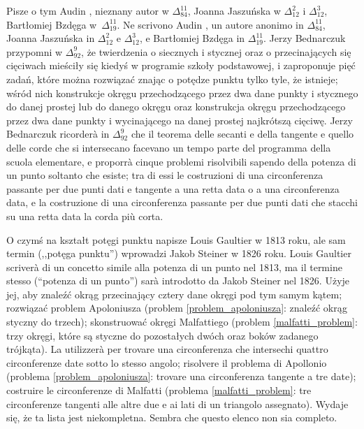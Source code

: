 Pisze o tym Audin \cite[s. 89]{audin_2003}, nieznany autor w $\Delta_{84}^{11}$, Joanna Jaszuńska w $\Delta_{12}^2$ i $\Delta_{12}^3$, Bartłomiej Bzdęga w~$\Delta_{19}^{11}$. %
Ne scrivono Audin \cite[p. 89]{audin_2003}, un autore anonimo in $\Delta_{84}^{11}$, Joanna Jaszuńska in $\Delta_{12}^2$ e $\Delta_{12}^3$, e Bartłomiej Bzdęga in $\Delta_{19}^{11}$. %
Jerzy Bednarczuk przypomni w $\Delta_{92}^{9}$, że twierdzenia o siecznych i stycznej oraz o przecinających się cięciwach mieściły się kiedyś w programie szkoły podstawowej, i zaproponuje pięć zadań, które można rozwiązać znając o potędze punktu tylko tyle, że istnieje; wśród nich konstrukcje okręgu przechodzącego przez dwa dane punkty i stycznego do danej prostej lub do danego okręgu oraz konstrukcja okręgu przechodzącego przez dwa dane punkty i wycinającego na danej prostej najkrótszą cięciwę. %
Jerzy Bednarczuk ricorderà in $\Delta_{92}^{9}$ che il teorema delle secanti e della tangente e quello delle corde che si intersecano facevano un tempo parte del programma della scuola elementare, e proporrà cinque problemi risolvibili sapendo della potenza di un punto soltanto che esiste; tra di essi le costruzioni di una circonferenza passante per due punti dati e tangente a una retta data o a una circonferenza data, e la costruzione di una circonferenza passante per due punti dati che stacchi su una retta data la corda più corta. %

O czymś na kształt potęgi punktu napisze Louis Gaultier w 1813 roku, ale sam termin (,,potęga punktu'') wprowadzi Jakob Steiner w 1826 roku. %
Louis Gaultier scriverà di un concetto simile alla potenza di un punto nel 1813, ma il termine stesso (``potenza di un punto'') sarà introdotto da Jakob Steiner nel 1826. %
%
%
Użyje jej, aby znaleźć okrąg przecinający cztery dane okręgi pod tym samym kątem; rozwiązać problem Apoloniusza (problem \ref{problem_apoloniusza}: znaleźć okrąg styczny do trzech); skonstruować okręgi Malfattiego (problem \ref{malfatti_problem}: trzy okręgi, które są styczne do pozostałych dwóch oraz boków zadanego trójkąta). %
La utilizzerà per trovare una circonferenza che intersechi quattro circonferenze date sotto lo stesso angolo; risolvere il problema di Apollonio (problema \ref{problem_apoloniusza}: trovare una circonferenza tangente a tre date); costruire le circonferenze di Malfatti (problema \ref{malfatti_problem}: tre circonferenze tangenti alle altre due e ai lati di un triangolo assegnato). %
Wydaje się, że ta lista jest niekompletna. %
Sembra che questo elenco non sia completo. %

